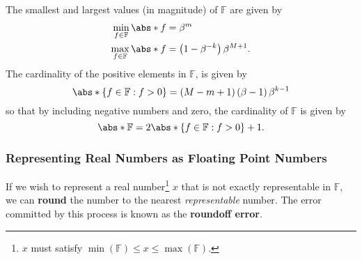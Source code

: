 \documentclass{article}
\begin{document}
\begin{corollary}
    The smallest and largest values (in magnitude) of \(\mathbb{F}\) are
    given by
    \begin{align*}
        \min_{f \in \mathbb{F}} \abs*{f} & = \beta^m                                      \\
        \max_{f \in \mathbb{F}} \abs*{f} & = \left( 1 - \beta^{-k} \right) \beta^{M + 1}.
    \end{align*}
    The cardinality of the positive elements in \(\mathbb{F}\), is given
    by
    \begin{equation*}
        \abs*{\left\{ f \in \mathbb{F} : f > 0 \right\}} = \left( M - m + 1 \right) \left( \beta - 1 \right) \beta^{k - 1}
    \end{equation*}
    so that by including negative numbers and zero, the cardinality of
    \(\mathbb{F}\) is given by
    \begin{equation*}
        \abs*{\mathbb{F}} = 2 \abs*{\left\{ f \in \mathbb{F} : f > 0 \right\}} + 1.
    \end{equation*}
\end{corollary}
\subsubsection{Representing Real Numbers as Floating Point Numbers}
If we wish to represent a real number\footnote{\(x\) must satisfy
\(\min{\left( \mathbb{F} \right)} \leq x \leq \max{\left( \mathbb{F}
\right)}\).} \(x\) that is not exactly representable in \(\mathbb{F}\),
we can \textbf{round} the number to the nearest \textit{representable}
number. The error committed by this process is known as the
\textbf{roundoff error}.
\end{document}

